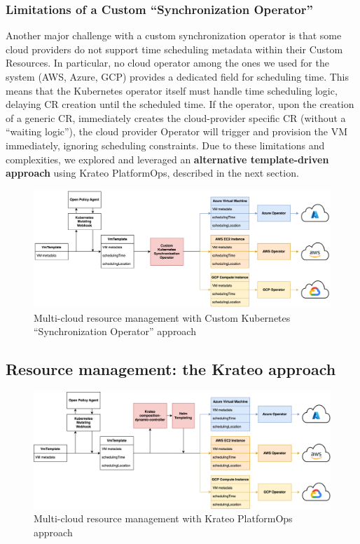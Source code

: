 \subsubsection{Limitations of a Custom ``Synchronization Operator''}
Another major challenge with a custom synchronization operator is that some cloud providers do not support time scheduling metadata within their Custom Resources. In particular, no cloud operator among the ones we used for the system (AWS, Azure, GCP) provides a dedicated field for scheduling time.
This means that the Kubernetes operator itself must handle time scheduling logic, delaying CR creation until the scheduled time.
If the operator, upon the creation of a generic CR, immediately creates the cloud-provider specific CR (without a ``waiting logic''), the cloud provider Operator will trigger and provision the VM immediately, ignoring scheduling constraints.
Due to these limitations and complexities, we explored and leveraged an \textbf{alternative template-driven approach} using Krateo PlatformOps, described in the next section.

\begin{figure}[htb]
  \centering
  \includegraphics[width=1\linewidth]{images/k8s_operator.png}
  \caption{Multi-cloud resource management with Custom Kubernetes ``Synchronization Operator'' approach}
  \label{fig:k8s_operator}
\end{figure}

\subsection{Resource management: the Krateo approach}

\begin{figure}[htb]
  \centering
  \includegraphics[width=1\linewidth]{images/krateo.png}
  \caption{Multi-cloud resource management with Krateo PlatformOps approach}
  \label{fig:krateo}
\end{figure}

